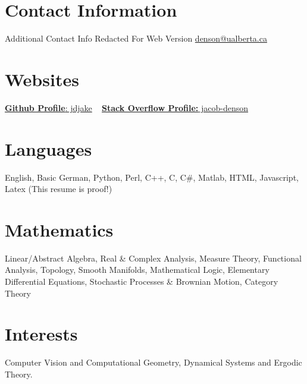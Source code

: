 \documentclass{friggeri-cv} %
\begin{document}


\begin{aside} %
\section{Contact Information}
Additional Contact Info Redacted For Web Version
\href{mailto:denson@ualberta.ca}{denson@ualberta.ca}
\section{Websites}
\href{https://github.com/jdjake}{{\bf Github Profile}: jdjake}
~
\href{http://stackoverflow.com/users/2601483/jacob-denson}{{\bf Stack Overflow Profile:} jacob-denson}
~
\section{Languages}
English, Basic German,
Python, Perl, C++, C, C\#, Matlab, HTML, Javascript, Latex (This resume is proof!)
\section{Mathematics}
Linear/Abstract Algebra, Real \& Complex Analysis, Measure Theory, Functional Analysis, Topology, Smooth Manifolds, Mathematical Logic, Elementary Differential Equations, Stochastic Processes \& Brownian Motion, Category Theory
\section{Interests}
Computer Vision and Computational Geometry, Dynamical Systems and Ergodic Theory.
\end{aside}

\end{document}
